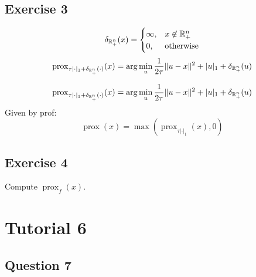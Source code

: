 \documentclass[12pt]{article}
\newcommand{\prox}{\operatorname{prox}}
\begin{document}
\subsection{Exercise 3}
\begin{equation}
  \delta_{\mathbb{R}_+^n} (x) = \begin{cases}
    \infty, & x \not \in \mathbb{R}_+^n \\
    0,      & \text{otherwise}
  \end{cases}
\end{equation}
\begin{equation}
  \prox_{\tau |\cdot|_1 + \delta_{\R_+^n} (\cdot)}(x) = \arg\min_{u} \frac{1}{2\tau}\|u-x\|^2 + |u|_1 + \delta_{\R_+^n} (u)
\end{equation}

\begin{equation}
  \prox_{\tau |\cdot|_1 + \delta_{\R_+^n} (\cdot)}(x) = \arg\min_{u} \frac{1}{2\tau}\|u-x\|^2 + |u|_1 + \delta_{\R_+^n} (u)
\end{equation}
Given by prof:
\begin{equation}
  \prox(x) = \max(\prox_{\tau |\cdot|_1}(x), 0)
\end{equation}


\subsection{Exercise 4}
Compute $\prox_{f}(x)$.


\section{Tutorial 6}
\subsection{Question 7}


\end{document}
